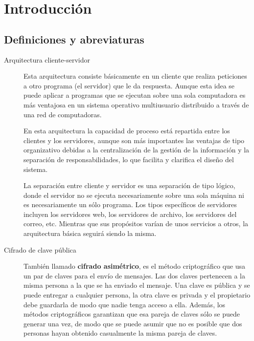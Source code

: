 \chapter{Introducción}\label{introduccion}
\section{Definiciones y abreviaturas}\label{definicionesyabreviaturas}

\begin{description}


\item[Arquitectura cliente-servidor]
Esta arquitectura consiste básicamente en un cliente que realiza peticiones a otro programa (el servidor) que le da respuesta. Aunque esta idea se puede aplicar a programas que se ejecutan sobre una sola computadora es más ventajosa en un sistema operativo multiusuario distribuido a través de una red de computadoras.


En esta arquitectura la capacidad de proceso está repartida entre los clientes y los servidores, aunque son más importantes las ventajas de tipo organizativo debidas a la centralización de la gestión de la información y la separación de responsabilidades, lo que facilita y clarifica el diseño del sistema.

La separación entre cliente y servidor es una separación de tipo lógico, donde el servidor no se ejecuta necesariamente sobre una sola máquina ni es necesariamente un sólo programa. Los tipos específicos de servidores incluyen los servidores web, los servidores de archivo, los servidores del correo, etc. Mientras que sus propósitos varían de unos servicios a otros, la arquitectura básica seguirá siendo la misma.

\item[Cifrado de clave pública]
También llamado \textbf{cifrado asimétrico}, es el método criptográfico que usa un par de claves para el envío de mensajes. Las dos claves pertenecen a la misma persona a la que se ha enviado el mensaje. Una clave es pública y se puede entregar a cualquier persona, la otra clave es privada y el propietario debe guardarla de modo que nadie tenga acceso a ella. Además, los métodos criptográficos garantizan que esa pareja de claves sólo se puede generar una vez, de modo que se puede asumir que no es posible que dos personas hayan obtenido casualmente la misma pareja de claves.


\end{description}
